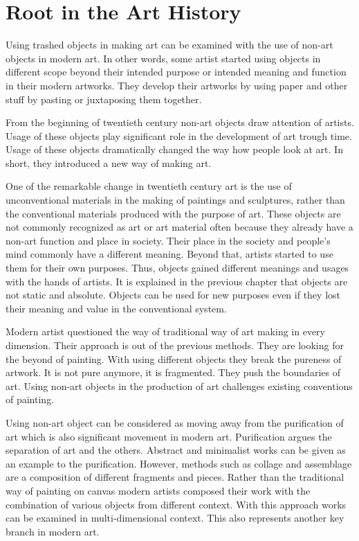 \section{Root in the Art History}
Using trashed objects in making art can be examined with the use of non-art objects in modern art. In other words, some artist started using objects in different scope beyond their intended purpose or intended meaning and function in their modern artworks. They develop their artworks by using paper and other stuff by pasting or juxtaposing them together.

From the beginning of twentieth century non-art objects draw attention of artists. Usage of these objects play significant role in the development of art trough time. Usage of these objects dramatically changed the way how people look at art. In short, they introduced a new way of making art.

One of the remarkable change in twentieth century art is the use of unconventional materials in the making of paintings and sculptures, rather than the conventional materials produced with the purpose of art. These objects are not commonly recognized as art or art material often because they already have a non-art function and place in society. Their place in the society and people’s mind commonly have a different meaning. Beyond that, artists started to use them for their own purposes. Thus, objects gained different meanings and usages with the hands of artists. It is explained in the previous chapter that objects are not static and absolute. Objects can be used for new purposes even if they lost their meaning and value in the conventional system.

Modern artist questioned the way of traditional way of art making in every dimension. Their approach is out of the previous methods. They are looking for the beyond of painting. With using different objects they break the pureness of artwork. It is not pure anymore, it is fragmented. They push the boundaries of art. Using non-art objects in the production of art challenges existing conventions of painting.

Using non-art object can be considered as moving away from the purification of art which is also significant movement in modern art. Purification argues the separation of art and the others. Abstract and minimalist works can be given as an example to the purification. However, methods such as collage and assemblage are a composition of different fragments and pieces. Rather than the traditional way of painting on canvas modern artists composed their work with the combination of various objects from different context. With this approach works can be examined in multi-dimensional context. This also represents another key branch in modern art.

